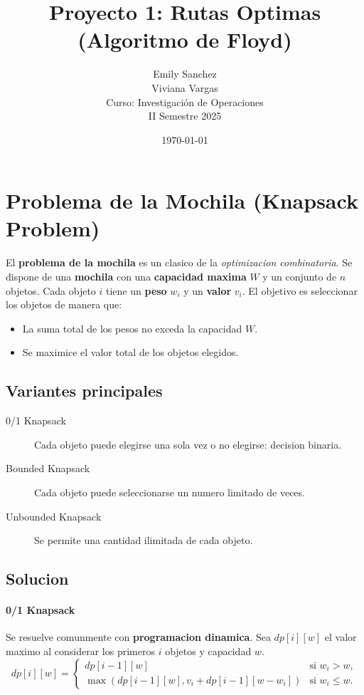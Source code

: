 \documentclass{article}
\title{Proyecto 1: Rutas Optimas (Algoritmo de Floyd)}
\author{Emily Sanchez \\ Viviana Vargas \\[1cm] Curso: Investigación de Operaciones \\ II Semestre 2025}
\date{\today}
\begin{document}
\maketitle

\thispagestyle{empty}
\newpage
\setcounter{page}{1}

\section{Problema de la Mochila (Knapsack Problem)}

El \textbf{problema de la mochila} es un clasico de la \textit{optimizacion combinatoria}. Se dispone de una \textbf{mochila} con una \textbf{capacidad maxima} $W$ y un conjunto de $n$ objetos. Cada objeto $i$ tiene un \textbf{peso} $w_i$ y un \textbf{valor} $v_i$. El objetivo es seleccionar los objetos de manera que:
\begin{itemize}
  \item La suma total de los pesos no exceda la capacidad $W$.
  \item Se maximice el valor total de los objetos elegidos.
\end{itemize}

\subsection{Variantes principales}
\begin{description}
  \item[0/1 Knapsack] Cada objeto puede elegirse una sola vez o no elegirse: decision binaria.
  \item[Bounded Knapsack] Cada objeto puede seleccionarse un numero limitado de veces.
  \item[Unbounded Knapsack] Se permite una cantidad ilimitada de cada objeto.
\end{description}

\subsection{Solucion}
\paragraph{0/1 Knapsack} Se resuelve comunmente con \textbf{programacion dinamica}. Sea $dp[i][w]$ el valor maximo al considerar los primeros $i$ objetos y capacidad $w$.
\[
dp[i][w] =
\begin{cases}
dp[i-1][w] & \text{si } w_i > w, \\
\max ( dp[i-1][w], v_i + dp[i-1][w - w_i] ) & \text{si } w_i \le w.
\end{cases}
\]
\end{document}
